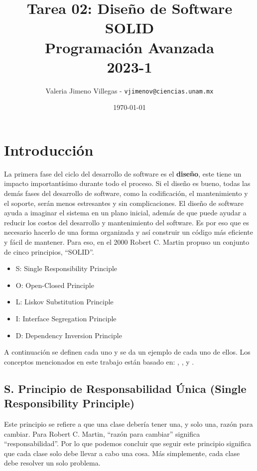 \documentclass[12pt, oneside]{article}
\title{Tarea 02: Diseño de Software SOLID \\[5pt] \normalsize Programación Avanzada \\[5pt] 2023-1}
\author{Valeria Jimeno Villegas - \texttt{vjimenov@ciencias.unam.mx}}
\date{\today}
\begin{document}
\maketitle

\section*{Introducción}

La primera fase del ciclo del desarrollo de software es el {\bf diseño}, este tiene un impacto importantísimo durante todo el proceso. Si el diseño es bueno, todas las demás fases del desarrollo de software, como la codificación, el mantenimiento y el soporte, serán menos estresantes y sin complicaciones.
El diseño de software ayuda a imaginar el sistema en un plano inicial, además de que puede ayudar a  reducir los costos del desarrollo y mantenimiento del software. Es por eso que es necesario hacerlo de una forma organizada y así construir un código más eficiente y fácil de mantener. Para eso, en el 2000 Robert C. Martin propuso un conjunto de cinco principios, ``SOLID''\cite{martin2000design}.

\begin{itemize}
	\item S: Single Responsibility Principle
	\item O: Open-Closed Principle
	\item L: Liskov Substitution Principle
	\item I: Interface Segregation Principle
	\item D: Dependency Inversion Principle
\end{itemize}	

A continuación se definen cada uno y se da un ejemplo de cada uno de ellos. Los conceptos mencionados en este trabajo están basado en: \cite{martin2000design}, \cite{singh2015effect}, \cite{martinez2021utilizacion} y \cite{solid_esp}. 

\subsection*{S. Principio de Responsabilidad Única (Single Responsibility Principle)}

\cite{martin2000design}

Este principio se refiere a que una clase debería tener una, y solo una, razón para cambiar. Para Robert C. Martin, ``razón para cambiar'' significa ``responsabilidad''. Por lo que podemos concluir que seguir este principio significa que cada clase solo debe llevar a cabo una cosa. Más simplemente, cada clase debe resolver un solo problema.
\end{document}
